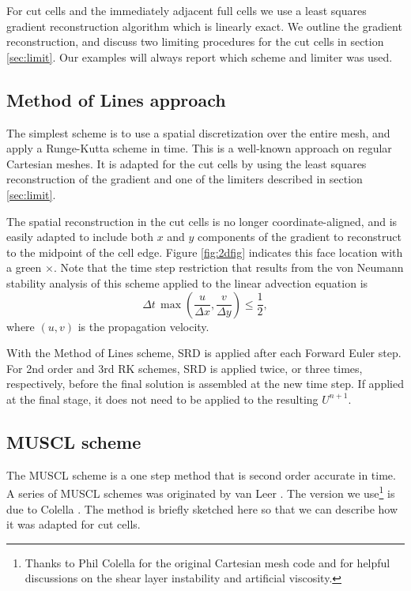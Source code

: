 For cut cells and the immediately adjacent full cells we use a least squares gradient reconstruction algorithm which is
linearly exact.  We outline the gradient reconstruction, and
discuss two  limiting procedures for the cut cells in 
section \ref{sec:limit}. Our examples will always report which scheme and
limiter was used.


\subsection{Method of Lines approach}
The simplest scheme is to use a spatial discretization over the entire
mesh, and apply a Runge-Kutta scheme in time. This is a well-known
approach
on regular Cartesian meshes. It is adapted for the cut cells by
using the  least squares reconstruction of the gradient and one of
the limiters described in section \ref{sec:limit}.

The spatial reconstruction in the cut cells is no longer
coordinate-aligned, and is easily adapted to  
include both $x$ and $y$ components of the gradient to 
reconstruct to the midpoint of the cell edge. 
Figure \ref{fig:2dfig}  indicates this face location with a green $\times$.
Note that the time step restriction that results from the von Neumann 
stability analysis of this scheme applied to the linear advection equation is
\begin{equation}
\Delta t \,  \max\left(\frac{u}{\Delta x},\frac{v}{\Delta y}\right) \leq \frac{1}{2} ,
\end{equation}
where $(u,v)$ is the propagation velocity.  

With the Method of Lines scheme, SRD is applied after each Forward Euler
step. For 2nd order and 3rd RK schemes, SRD is applied twice, or three
times, respectively, before the final solution is assembled at the new time
step. If applied at the final stage, it does not need to be applied to the 
resulting $U^{n+1}$.

\subsection{MUSCL scheme}
The MUSCL scheme is a one step method that is second order accurate in
time. A series of MUSCL schemes  was originated by van Leer 
\cite{vanleer:muscl}. The version we use\footnote{Thanks to Phil 
Colella for the original Cartesian mesh code and for helpful discussions on the shear
layer instability and artificial viscosity.}
is due to Colella \cite{Colella:Unsplit}.
The method is briefly sketched here so that we can describe how it was
adapted for cut cells. 

